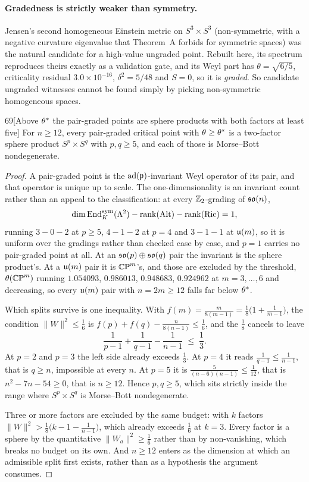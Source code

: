 \paragraph{Gradedness is strictly weaker than symmetry.} Jensen's second homogeneous Einstein metric on $S^3\times S^3$ (non-symmetric, with a negative curvature eigenvalue that Theorem~A forbids for symmetric spaces) was the natural candidate for a high-value ungraded point. Rebuilt here, its spectrum reproduces theirs exactly as a validation gate, and its Weyl part has $\theta=\sqrt{6/5}$, criticality residual $3.0\times10^{-16}$, $\delta^2=5/48$ and $S=0$, so it is \emph{graded}. So candidate ungraded witnesses cannot be found simply by picking non-symmetric homogeneous spaces.

\begin{Lem}{69}[Above $\theta^{*}$ the pair-graded points are sphere products with both factors at least five]
For $n\ge12$, every pair-graded critical point with $\theta\ge\theta^{*}$ is a two-factor sphere product $S^p\times S^q$ with $p,q\ge5$, and each of those is Morse--Bott nondegenerate.
\end{Lem}

\begin{proof}
A pair-graded point is the $\mathrm{ad}(\mathfrak{p})$-invariant Weyl operator of its pair, and that operator is unique up to scale. The one-dimensionality is an invariant count rather than an appeal to the classification: at every $\mathbb{Z}_2$-grading of $\mathfrak{so}(n)$,
\[
\dim\operatorname{End}^{\mathrm{sym}}_K(\Lambda^2)-\operatorname{rank}(\mathrm{Alt})-\operatorname{rank}(\mathrm{Ric})=1,
\]
running $3-0-2$ at $p\ge5$, $4-1-2$ at $p=4$ and $3-1-1$ at $\mathfrak{u}(m)$, so it is uniform over the gradings rather than checked case by case, and $p=1$ carries no pair-graded point at all. At an $\mathfrak{so}(p)\oplus\mathfrak{so}(q)$ pair the invariant is the sphere product's. At a $\mathfrak{u}(m)$ pair it is $\mathbb{CP}^m$'s, and those are excluded by the threshold, $\theta(\mathbb{CP}^m)$ running $1.054093$, $0.986013$, $0.948683$, $0.924962$ at $m=3,\dots,6$ and decreasing, so every $\mathfrak{u}(m)$ pair with $n=2m\ge12$ falls far below $\theta^{*}$.

Which splits survive is one inequality. With $f(m)=\tfrac m{8(m-1)}=\tfrac18\bigl(1+\tfrac1{m-1}\bigr)$, the condition $\|W\|^2\le\tfrac16$ is $f(p)+f(q)-\tfrac n{8(n-1)}\le\tfrac16$, and the $\tfrac18$ cancels to leave
\[
\frac1{p-1}+\frac1{q-1}-\frac1{n-1}\;\le\;\frac13 .
\]
At $p=2$ and $p=3$ the left side already exceeds $\tfrac13$. At $p=4$ it reads $\tfrac1{q-1}\le\tfrac1{n-1}$, that is $q\ge n$, impossible at every $n$. At $p=5$ it is $\tfrac5{(n-6)(n-1)}\le\tfrac1{12}$, that is $n^2-7n-54\ge0$, that is $n\ge12$. Hence $p,q\ge5$, which sits strictly inside the range where $S^p\times S^q$ is Morse--Bott nondegenerate.

Three or more factors are excluded by the same budget: with $k$ factors $\|W\|^2>\tfrac18\bigl(k-1-\tfrac1{n-1}\bigr)$, which already exceeds $\tfrac16$ at $k=3$. Every factor is a sphere by the quantitative $\|W_a\|^2\ge\tfrac16$ rather than by non-vanishing, which breaks no budget on its own. And $n\ge12$ enters as the dimension at which an admissible split first exists, rather than as a hypothesis the argument consumes.

\end{proof}

